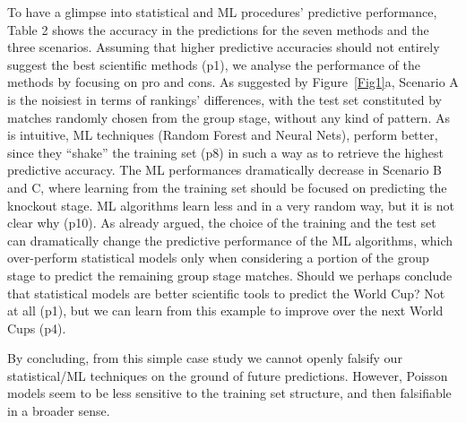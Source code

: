 \documentclass{statsoc}
\begin{document}
To have a glimpse into statistical and ML procedures' predictive performance, Table 2 shows the accuracy in the predictions for the seven methods and the three  scenarios. Assuming that 
higher predictive accuracies should not entirely suggest the best scientific methods (p1), we analyse the performance of the methods by focusing on pro and cons. As suggested by 
Figure~\ref{Fig1}a, Scenario A is the  noisiest in terms of rankings' differences,  with the test set constituted by matches randomly chosen from the group stage, without any kind 
of pattern. As  is intuitive, ML techniques (Random Forest and Neural Nets), perform better, since they ``shake'' the training set (p8) in such a way as to retrieve the highest 
predictive accuracy. The ML performances dramatically decrease in Scenario B and C, where learning from the training set should be focused on predicting the knockout stage. ML algorithms learn less and in a very random way, but it is not clear why (p10).
As already argued, the choice of the training and the test set can dramatically 
change the predictive performance of the ML algorithms, which over-perform statistical models only when considering a portion of the group stage to predict the remaining 
group stage matches. Should  we perhaps conclude that statistical models are better scientific tools to predict the World Cup? Not at all (p1), but we can learn from this example to improve over the next World Cups (p4).

By concluding, from this simple case study we cannot openly 
falsify our statistical/ML techniques on the ground of future predictions. However, Poisson models seem to be less sensitive to the training set structure, and then falsifiable in a broader sense.
\end{document}
